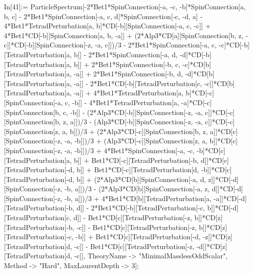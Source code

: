 In[41]:= ParticleSpectrum[-2*Bet1*SpinConnection[-a, -c, -b]*SpinConnection[a, b, c] - 2*Bet1*SpinConnection[-a, c, d]*SpinConnection[-c, -d, a] - 4*Bet1*TetradPerturbation[a, b]*CD[-b][SpinConnection[-a, c, -c]] + 4*Bet1*CD[-b][SpinConnection[a, b, -a]] + (2*Alp3*CD[a][SpinConnection[b, z, -c]]*CD[-b][SpinConnection[-z, -a, c]])/3 - 2*Bet1*SpinConnection[-a, c, -c]*CD[-b][TetradPerturbation[a, b]] - 2*Bet1*SpinConnection[-a, d, -d]*CD[-b][TetradPerturbation[a, b]] + 2*Bet1*SpinConnection[-b, c, -c]*CD[b][TetradPerturbation[a, -a]] + 2*Bet1*SpinConnection[-b, d, -d]*CD[b][TetradPerturbation[a, -a]] - 2*Bet1*CD[-b][TetradPerturbation[c, -c]]*CD[b][TetradPerturbation[a, -a]] + 4*Bet1*TetradPerturbation[a, b]*CD[-c][SpinConnection[-a, c, -b]] - 4*Bet1*TetradPerturbation[a, -a]*CD[-c][SpinConnection[b, c, -b]] - (2*Alp3*CD[-b][SpinConnection[-z, -a, c]]*CD[-c][SpinConnection[b, z, a]])/3 - (Alp3*CD[-b][SpinConnection[-z, -a, c]]*CD[-c][SpinConnection[z, a, b]])/3 + (2*Alp3*CD[-c][SpinConnection[b, z, a]]*CD[c][SpinConnection[-z, -a, -b]])/3 + (Alp3*CD[-c][SpinConnection[z, a, b]]*CD[c][SpinConnection[-z, -a, -b]])/3 + 4*Bet1*SpinConnection[-a, -c, -b]*CD[c][TetradPerturbation[a, b]] + Bet1*CD[-c][TetradPerturbation[-b, d]]*CD[c][TetradPerturbation[-d, b]] + Bet1*CD[-c][TetradPerturbation[d, -b]]*CD[c][TetradPerturbation[-d, b]] + (2*Alp3*CD[b][SpinConnection[-a, d, z]]*CD[-d][SpinConnection[-z, -b, a]])/3 - (2*Alp3*CD[b][SpinConnection[-a, z, d]]*CD[-d][SpinConnection[-z, -b, a]])/3 + 4*Bet1*CD[b][TetradPerturbation[a, -a]]*CD[-d][TetradPerturbation[-b, d]] - 2*Bet1*CD[-b][TetradPerturbation[-c, b]]*CD[-d][TetradPerturbation[c, d]] - Bet1*CD[c][TetradPerturbation[-z, b]]*CD[z][TetradPerturbation[-b, -c]] - Bet1*CD[c][TetradPerturbation[-z, b]]*CD[z][TetradPerturbation[-c, -b]] + Bet1*CD[c][TetradPerturbation[-d, -z]]*CD[z][TetradPerturbation[d, -c]] - Bet1*CD[c][TetradPerturbation[-z, -d]]*CD[z][TetradPerturbation[d, -c]], TheoryName -> "MinimalMasslessOddScalar", Method -> "Hard", MaxLaurentDepth -> 3]; 
